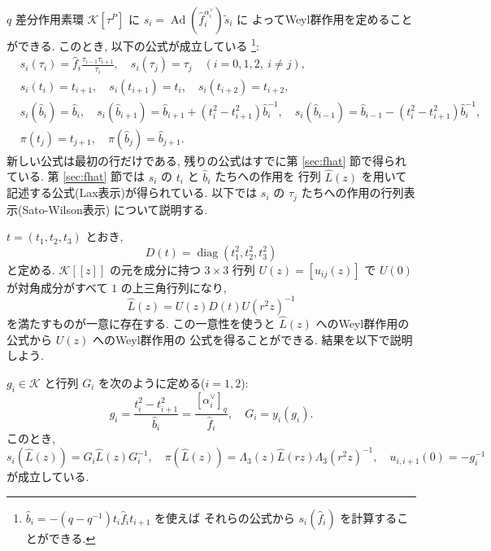 \documentclass[12pt,twoside,dvipdfm]{msjproc}
\theoremstyle{definition} %
\theoremstyle{definition} %
\theoremstyle{definition} %
\numberwithin{theorem}{section}
\numberwithin{equation}{section}
\numberwithin{figure}{section}
\numberwithin{table}{section}
\newcommand\secref[1]{第 \ref{#1} 節}
\newcommand\K{\mathcal{K}}
\newcommand\diag{\mathop{\mathrm{diag}}\nolimits}
\newcommand\Ad{\mathop{\mathrm{Ad}}\nolimits}
\newcommand\ts{{\tilde{s}}}
\newcommand\hL{{\widehat{L}}}
\newcommand\hb{{\hat{b}}}
\newcommand\hf{{\hat{f}}}
\newcommand\av{\alpha^\vee}
\begin{document}
$q$ 差分作用素環 $\K[\tau^P]$ に $s_i=\Ad(\hf_i^{\av_i})\ts_i$ に
よってWeyl群作用を定めることができる. このとき, 以下の公式が成立している%
\footnote{$\hb_i=-(q-q^{-1})t_i\hf_i t_{i+1}$ を使えば
それらの公式から $s_i(\hf_i)$ を計算することができる.}:
\begin{align*}
 &
 s_i(\tau_i) = \hf_i \frac{\tau_{i-1}\tau_{i+1}}{\tau_i}, \quad
 s_i(\tau_j) = \tau_j \quad
 (i=0,1,2,\ i\ne j),
 \\ &
 s_i(t_i) = t_{i+1}, \quad
 s_i(t_{i+1}) = t_i, \quad
 s_i(t_{i+2}) = t_{i+2},
 \\ &
 s_i(\hb_i) = \hb_i, \quad
 s_i(\hb_{i+1}) = \hb_{i+1} + (t_i^2-t_{i+1}^2)\hb_i^{-1}, \quad
 s_i(\hb_{i-1}) = \hb_{i-1} - (t_i^2-t_{i+1}^2)\hb_i^{-1},
 \\ &
 \pi(t_j) = t_{j+1}, \quad
 \pi(\hb_j) = \hb_{j+1}.
\end{align*}
新しい公式は最初の行だけである, 
残りの公式はすでに\secref{sec:fhat}で得られている.
\secref{sec:fhat}では $s_i$ の $t_i$ と $\hb_i$ たちへの作用を
行列 $\hL(z)$ を用いて記述する公式(Lax表示)が得られている.
以下では $s_i$ の $\tau_j$ たちへの作用の行列表示(Sato-Wilson表示)
について説明する.

$t=(t_1,t_2,t_3)$ とおき,
\begin{equation*}
 D(t)=\diag(t_1^2,t_2^2,t_3^2)
\end{equation*}
と定める.
$\K[[z]]$ の元を成分に持つ $3\times 3$ 行列 $U(z)=[u_{ij}(z)]$ 
で $U(0)$ が対角成分がすべて $1$ の上三角行列になり, 
\begin{equation*}
  \hL(z) = U(z)D(t)U(r^2z)^{-1}
\end{equation*}
を満たすものが一意に存在する.  
この一意性を使うと $\hL(z)$ へのWeyl群作用の公式から $U(z)$ へのWeyl群作用の
公式を得ることができる. 結果を以下で説明しよう.

$g_i\in\K$ と行列 $G_i$ を次のように定める($i=1,2$):
\begin{equation*}
 g_i = \frac{t_i^2-t_{i+1}^2}{\hb_i} = \frac{[\av_i]_q}{\hf_i}, \quad
 G_i = y_i(g_i).
\end{equation*}
このとき,
\begin{equation*}
 s_i(\hL(z)) = G_i \hL(z) G_i^{-1}, \quad
 \pi(\hL(z)) = \Lambda_3(z)\hL(rz)\Lambda_3(r^2z)^{-1}, \quad
 u_{i,i+1}(0) =  -g_i^{-1}
\end{equation*}
が成立している. 
\end{document}
